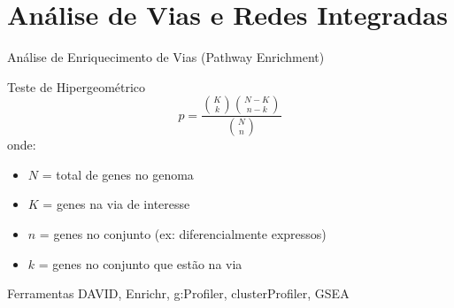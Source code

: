 \section{Análise de Vias e Redes Integradas}

\begin{frame}{Análise de Enriquecimento de Vias (Pathway Enrichment)}

\begin{block}{Teste de Hipergeométrico}
\begin{equation*}
p = \frac{\binom{K}{k}\binom{N-K}{n-k}}{\binom{N}{n}}
\end{equation*}
onde:
\begin{itemize}
    \item $N$ = total de genes no genoma
    \item $K$ = genes na via de interesse
    \item $n$ = genes no conjunto (ex: diferencialmente expressos)
    \item $k$ = genes no conjunto que estão na via
\end{itemize}
\end{block}

\begin{exampleblock}{Ferramentas}
DAVID, Enrichr, g:Profiler, clusterProfiler, GSEA
\end{exampleblock}
\end{frame}

